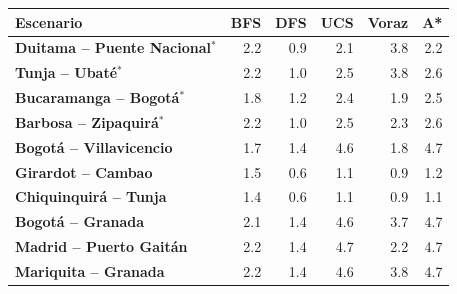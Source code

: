 \renewcommand{\arraystretch}{1.2}
\begin{tabular}{|l|r|r|r|r|r|}
\hline
\rowcolor{gray!20} \textbf{Escenario} & \textbf{BFS} & \textbf{DFS} & \textbf{UCS} & \textbf{Voraz} & \textbf{A*} \\
\hline
\textbf{Duitama -- Puente Nacional$^{*}$} & 2.2 & 0.9 & 2.1 & 3.8 & 2.2 \\
\hline
\textbf{Tunja -- Ubaté$^{*}$} & 2.2 & 1.0 & 2.5 & 3.8 & 2.6 \\
\hline
\textbf{Bucaramanga -- Bogotá$^{*}$} & 1.8 & 1.2 & 2.4 & 1.9 & 2.5 \\
\hline
\textbf{Barbosa -- Zipaquirá$^{*}$} & 2.2 & 1.0 & 2.5 & 2.3 & 2.6 \\
\hline
\textbf{Bogotá -- Villavicencio} & 1.7 & 1.4 & 4.6 & 1.8 & 4.7 \\
\hline
\textbf{Girardot -- Cambao} & 1.5 & 0.6 & 1.1 & 0.9 & 1.2 \\
\hline
\textbf{Chiquinquirá -- Tunja} & 1.4 & 0.6 & 1.1 & 0.9 & 1.1 \\
\hline
\textbf{Bogotá -- Granada} & 2.1 & 1.4 & 4.6 & 3.7 & 4.7 \\
\hline
\textbf{Madrid -- Puerto Gaitán} & 2.2 & 1.4 & 4.7 & 2.2 & 4.7 \\
\hline
\textbf{Mariquita -- Granada} & 2.2 & 1.4 & 4.6 & 3.8 & 4.7 \\
\hline
\end{tabular}
